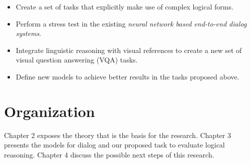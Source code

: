 \begin{itemize}
\item Create a set of tasks that explicitly make use of complex logical forms.
\item Perform a stress test in the existing \textit{neural network based end-to-end dialog systems}.
\item Integrate linguistic reasoning with visual references to create a new set of visual question answering (VQA) tasks.
\item Define new models to achieve better results in the tasks proposed above. 
\end{itemize}

\section{Organization}
\label{sec:organization}

Chapter 2 exposes the theory that is the basis for the research. Chapter 3 presents the models for dialog and our proposed task to evaluate logical reasoning. Chapter 4 discuss the possible next steps of this research.
